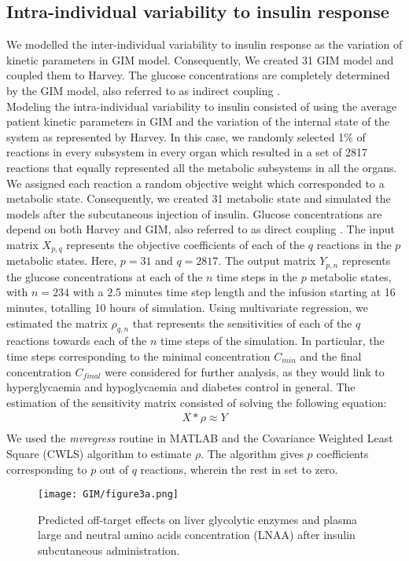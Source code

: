 \subsection{Intra-individual variability to insulin response}
We modelled the inter-individual variability to insulin response as the variation of kinetic parameters in GIM model. Consequently, We created 31 GIM model and coupled them to Harvey. The glucose concentrations are completely determined by the GIM model, also referred to as indirect coupling \cite{krauss2012integrating}.\\
Modeling the intra-individual variability to insulin consisted of using the average patient kinetic parameters in GIM and the variation of the internal state of the system as represented by Harvey. In this case, we randomly selected 1\% of reactions in every subsystem in every organ which resulted in a set of 2817 reactions that equally represented all the metabolic subsystems in all the organs. We assigned each reaction a random objective weight which corresponded to a metabolic state. Consequently, we created 31 metabolic state and simulated the models after the subcutaneous injection of insulin. Glucose concentrations are depend on both Harvey and GIM, also referred to as direct coupling \cite{krauss2012integrating}. The input matrix $X_{p,q}$ represents the objective coefficients of each of the $q$ reactions in the $p$ metabolic states. Here, $p=31$ and $q=2817$. The output matrix $Y_{p,n}$ represents the glucose concentrations at each of the $n$ time steps in the $p$ metabolic states, with $n=234$ with a 2.5 minutes time step length and the infusion starting at 16 minutes, totalling 10 hours of simulation. Using multivariate regression, we estimated the matrix $\rho_{q,n}$ that represents the sensitivities of each of the $q$ reactions towards each of the $n$ time steps of the simulation. In particular, the time steps corresponding to the minimal concentration $C_{min}$ and the final concentration $C_{final}$ were considered for further analysis, as they would link to hyperglycaemia and hypoglycaemia and diabetes control in general. The estimation of the sensitivity matrix consisted of solving the following equation:
\begin{gather*}
X* \rho \approx Y \\
\end{gather*}
We used the \textit{mvregress} routine in MATLAB and the Covariance Weighted Least Square (CWLS) algorithm to estimate $\rho$. The algorithm gives $p$ coefficients corresponding to $p$ out of $q$ reactions, wherein the rest in set to zero.
\begin{figure}[!htp]
\centering
	\texttt{[image: GIM/figure3a.png]}%
	\caption[Effect of insulin on LNAA concentrations.]{Predicted off-target effects on liver glycolytic enzymes and plasma large and neutral amino acids concentration (LNAA) after insulin subcutaneous administration.}
	\label{fig:GIM3a}
\end{figure}

